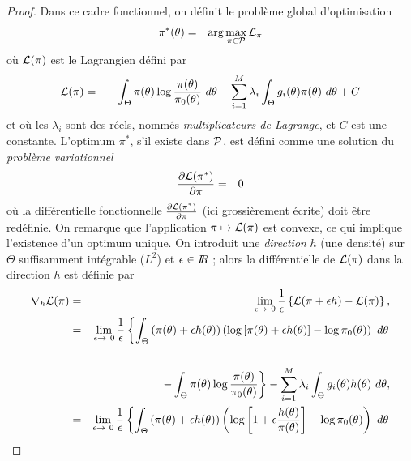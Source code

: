 \begin{proof} %
Dans ce cadre fonctionnel, on définit le problème global d'optimisation 
\begin{eqnarray*}
\textcolor{black}{\pi^*(\theta)} & = & \arg\max\limits_{\pi\in{\cal{P}}} {\cal{L}}_{\pi}
\end{eqnarray*}
où ${\cal{L}}({\pi})$ est le Lagrangien défini par
\begin{eqnarray*}
{\cal{L}}({\pi}) & = &  - \int_{\Theta} \pi(\theta) \log\frac{\pi(\theta)}{\pi_0(\theta)} \ d\theta  - \sum\limits_{i=1}^M \lambda_i \int_{\Theta} g_i(\theta) \pi(\theta) \ d\theta + C
\end{eqnarray*}
et où les $\lambda_i$ sont des réels, nommés {\it multiplicateurs de Lagrange}, et $C$ est une constante. L'optimum $\pi^*$, s'il existe dans ${\cal{P}}$, est défini comme une solution du {\it problème variationnel}
\begin{eqnarray*}
\frac{\partial {\cal{L}}({\pi^*})}{\partial \pi} & = &  0
\end{eqnarray*}
où la différentielle fonctionnelle $\frac{\partial {\cal{L}}({\pi^*})}{\partial \pi}$ (ici grossièrement écrite) doit être redéfinie. On remarque que l'application $\pi\mapsto {\cal{L}}({\pi})$ est convexe, ce qui implique l'existence d'un optimum unique. On introduit une {\it direction} $h$ (une densité) sur $\Theta$ suffisamment intégrable ($L^2$) et $\epsilon\in I\!\!R$ ; alors la différentielle de ${\cal{L}}({\pi})$ dans la direction $h$ est définie par
\begin{eqnarray*}
\nabla_h {\cal{L}}({\pi}) & = & \lim\limits_{\epsilon\to\ 0} \frac{1}{\epsilon}\left\{{\cal{L}}({\pi + \epsilon h})  - {\cal{L}}({\pi})\right\}, \\
& = &  \lim\limits_{\epsilon\to\ 0} \frac{1}{\epsilon}\left\{ \int_{\Theta} \left(\pi(\theta) + \epsilon h(\theta)\right) \left( \log \left[ \pi(\theta) + \epsilon h(\theta)\right]  - \log \pi_0(\theta)\right)\ d\theta \right. \\   \\
&  & \left. - \int_{\Theta} \pi(\theta) \log\frac{\pi(\theta)}{\pi_0(\theta)} \right\}   -   \sum\limits_{i=1}^M \lambda_i \int_{\Theta} g_i(\theta) h(\theta) \ d\theta, \\
& = &  \lim\limits_{\epsilon\to\ 0} \frac{1}{\epsilon} \left\{ \int_{\Theta} \left(\pi(\theta) + \epsilon h(\theta)\right) \left( \log \left[ 1 + \epsilon \frac{h(\theta)}{\pi(\theta)}\right]  - \log \pi_0(\theta)\right) \ d\theta  \right. \\

\end{eqnarray*}
\end{proof}
